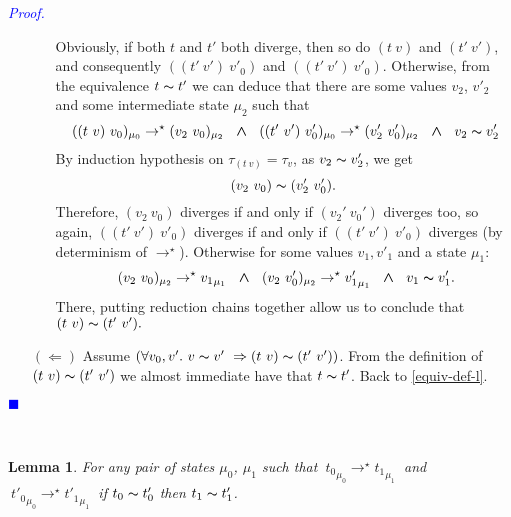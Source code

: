 \documentclass[a4paper,11pt,oneside]{article}
\theoremstyle{plain}
\newtheorem{lemma}[definition]{Lemma}
\renewenvironment{proof}{\noindent \textcolor{blue}{\textit{Proof.}}}
{{\begin{tiny}\textcolor{blue}{$\blacksquare$}\end{tiny}}\\}
\newcommand{\tmapp}[2]{(#1 ~ #2)}
\newcommand{\ty}[1][]{\tau_{#1}}
\newcommand{\bwedge}{\boldsymbol{~\wedge~}}
\newcommand{\evalstar}[4]{~#1_{\mu_#2} \rightarrow^{\star} #3_{\mu_#4} ~}
\newcommand{\eqv}[1]{#1 \thicksim #1'}
\begin{document}
\begin{proof}
\begin{itemize}
\begin{itemize}
		Obviously, if both $t$ and $t'$ both diverge,
		then so do $\tmapp{t}{v}$ and $\tmapp{t'}{v'}$, and consequently 
		$\tmapp{\tmapp{t'}{v'}}{v'_0}$ and $\tmapp{\tmapp{t'}{v'}}{v'_0}$.
		Otherwise, from the equivalence $\eqv{t}$ we can deduce that there are
		some values $v_2$, $v'_2$ and some intermediate state $\mu_2$ such that
		$$\evalstar{\tmapp{\tmapp{t}{v}}{v_0}}{0}{\tmapp{v_2}{v_0}}{2} \bwedge
		\evalstar{\tmapp{\tmapp{t'}{v'}}{v'_0}}{0}{\tmapp{v'_2}{v'_0}}{2} 
		\bwedge~\eqv{v_2}$$	
		By induction hypothesis on $\ty[\tmapp{t}{v}]=\ty[v]$, as $\eqv{v_2}$, we 
		get	$$ \tmapp{v_2}{v_0} \thicksim \tmapp{v'_2}{v'_0}.$$ Therefore, 
		$\tmapp{v_2}{v_0}$ diverges if and only if $\tmapp{v_2'}{v_0'}$ diverges 
		too, so again, $\tmapp{\tmapp{t'}{v'}}{v'_0}$ diverges if and only if 
		$\tmapp{\tmapp{t'}{v'}}{v'_0}$ diverges (by determinism of 
		$\rightarrow^\star$). Otherwise for some values $v_1, v'_1$ and a state
		$\mu_1$:
		$$\evalstar{\tmapp{v_2}{v_0}}{2}{{v_1}}{1} \bwedge
		\evalstar{\tmapp{v_2}{v'_0}}{2}{{v'_1}}{1} 
		\bwedge~\eqv{v_1}.$$ There, putting reduction chains together allow us to 
		conclude that $\tmapp{t}{v} \thicksim \tmapp{t'}{v'}.$ 
		\end{itemize}
		
	
		\item[$(\Leftarrow)$] Assume $(\forall v_0, v'.~\eqv{v}~\Rightarrow
		\tmapp{t}{v} \thicksim \tmapp{t'}{v'})$. From the definition of 
		\mbox{$\tmapp{t}{v}\thicksim\tmapp{t'}{v'}$} we almost immediate have 
		that $\eqv{t}$. Back to \ref{equiv-def-l}.
				
		\end{itemize}	
	\end{proof}

	\begin{lemma}
		For any pair of states $\mu_0$, $\mu_1$ such that
		$\evalstar{{t_0}}{0}{{t_1}}{1}$ and $\evalstar{{t'_0}}{0}{{t'_1}}{1}$
		if $\eqv{t_0}$ then $\eqv{t_1}$.
		\label{equiv-red2-p}
	\end{lemma}
	
\end{document}
